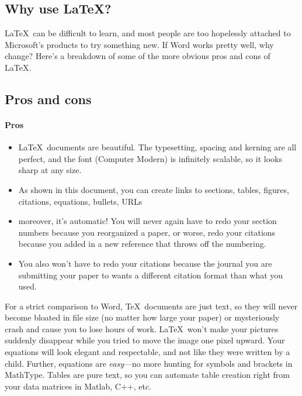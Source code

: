 \documentclass[12pt]{article}
\begin{document}
\subsection{Why use \LaTeX?}
\LaTeX\ can be difficult to learn, and most people are too hopelessly attached to Microsoft's products to try something new. If Word works pretty well, why change? Here's a breakdown of some of the more obvious pros and cons of \LaTeX.

\subsection{Pros and cons}

\paragraph{Pros} 
\begin{itemize}
	\item \LaTeX\ documents are beautiful. The typesetting, spacing and kerning are all perfect, and the font (Computer Modern) is infinitely scalable, so it looks sharp at any size.
	\item As shown in this document, you can create links to sections, tables, figures, citations, equations, bullets, URLs
	\item moreover, it's automatic! You will never again have to redo your section numbers because you reorganized a paper, or worse, redo your citations because you added in a new reference that throws off the numbering.
	\item You also won't have to redo your citations because the journal you are submitting your paper to wants a different citation format than what you used.
\end{itemize}  


For a strict comparison to Word, \TeX\ documents are just text, so they will never become bloated in file size (no matter how large your paper) or mysteriously crash and cause you to lose hours of work. \LaTeX\ won't make your pictures suddenly disappear while you tried to move the image one pixel upward. Your equations will look elegant and respectable, and not like they were written by a child. Further, equations are \textit{easy}---no more hunting for symbols and brackets in MathType. Tables are pure text, so you can automate table creation right from your data matrices in Matlab, C++, etc.
\end{document}
